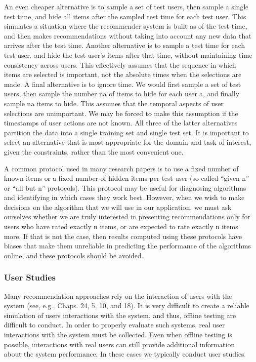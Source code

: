 An even cheaper alternative is to sample a set of test users, then sample a single test time, and hide all items after the sampled test time for each test user. This simulates a situation where the recommender system is built as of the test time, and then makes recommendations without taking into account any new data that arrives after the test time. Another alternative is to sample a test time for each test user, and hide the test user’s items after that time, without maintaining time consistency across users. This effectively assumes that the sequence in which items are selected is important, not the absolute times when the selections are made. A final alternative is to ignore time. We would first sample a set of test users, then sample the number na of items to hide for each user a, and finally sample na items to hide. This assumes that the temporal aspects of user selections are unimportant. We may be forced to make this assumption if the timestamps of user actions are not known. All three of the latter alternatives partition the data into a single training set and single test set. It is important to select an alternative that is most appropriate for the domain and task of interest, given the constraints, rather than the most convenient one.

A common protocol used in many research papers is to use a fixed number of known items or a fixed number of hidden items per test user (so called “given n” or “all but n” protocols). This protocol may be useful for diagnosing algorithms and identifying in which cases they work best. However, when we wish to make decisions on the algorithm that we will use in our application, we must ask ourselves whether we are truly interested in presenting recommendations only for users who have rated exactly n items, or are expected to rate exactly n items more. If that is not the case, then results computed using these protocols have biases that make them unreliable in predicting the performance of the algorithms online, and these protocols should be avoided.

\subsubsection{User Studies}

Many recommendation approaches rely on the interaction of users with the system (see, e.g., Chaps. 24, 5, 10, and 18). It is very difficult to create a reliable simulation of users interactions with the system, and thus, offline testing are difficult to conduct. In order to properly evaluate such systems, real user interactions with the system must be collected. Even when offline testing is possible, interactions with real users can still provide additional information about the system performance. In these cases we typically conduct user studies.

